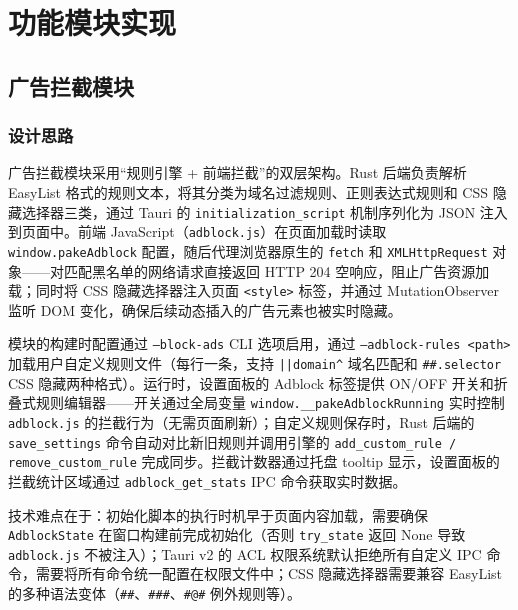 \documentclass[12pt,a4paper]{ctexart}
\begin{document}
\section{功能模块实现}

\subsection{广告拦截模块}

\subsubsection{设计思路}

广告拦截模块采用``规则引擎 + 前端拦截''的双层架构。Rust 后端负责解析 EasyList 格式的规则文本，将其分类为域名过滤规则、正则表达式规则和 CSS 隐藏选择器三类，通过 Tauri 的 \texttt{initialization\_script} 机制序列化为 JSON 注入到页面中。前端 JavaScript（\texttt{adblock.js}）在页面加载时读取 \texttt{window.pakeAdblock} 配置，随后代理浏览器原生的 \texttt{fetch} 和 \texttt{XMLHttpRequest} 对象——对匹配黑名单的网络请求直接返回 HTTP 204 空响应，阻止广告资源加载；同时将 CSS 隐藏选择器注入页面 \texttt{<style>} 标签，并通过 MutationObserver 监听 DOM 变化，确保后续动态插入的广告元素也被实时隐藏。

模块的构建时配置通过 \texttt{--block-ads} CLI 选项启用，通过 \texttt{--adblock-rules <path>} 加载用户自定义规则文件（每行一条，支持 \texttt{||domain\textasciicircum} 域名匹配和 \texttt{\#\#.selector} CSS 隐藏两种格式）。运行时，设置面板的 Adblock 标签提供 ON/OFF 开关和折叠式规则编辑器——开关通过全局变量 \texttt{window.\_\_pakeAdblockRunning} 实时控制 \texttt{adblock.js} 的拦截行为（无需页面刷新）；自定义规则保存时，Rust 后端的 \texttt{save\_settings} 命令自动对比新旧规则并调用引擎的 \texttt{add\_custom\_rule / remove\_custom\_rule} 完成同步。拦截计数器通过托盘 tooltip 显示，设置面板的拦截统计区域通过 \texttt{adblock\_get\_stats} IPC 命令获取实时数据。

技术难点在于：初始化脚本的执行时机早于页面内容加载，需要确保 \texttt{AdblockState} 在窗口构建前完成初始化（否则 \texttt{try\_state} 返回 None 导致 \texttt{adblock.js} 不被注入）；Tauri v2 的 ACL 权限系统默认拒绝所有自定义 IPC 命令，需要将所有命令统一配置在权限文件中；CSS 隐藏选择器需要兼容 EasyList 的多种语法变体（\texttt{\#\#}、\texttt{\#\#\#}、\texttt{\#@\#} 例外规则等）。
\end{document}
